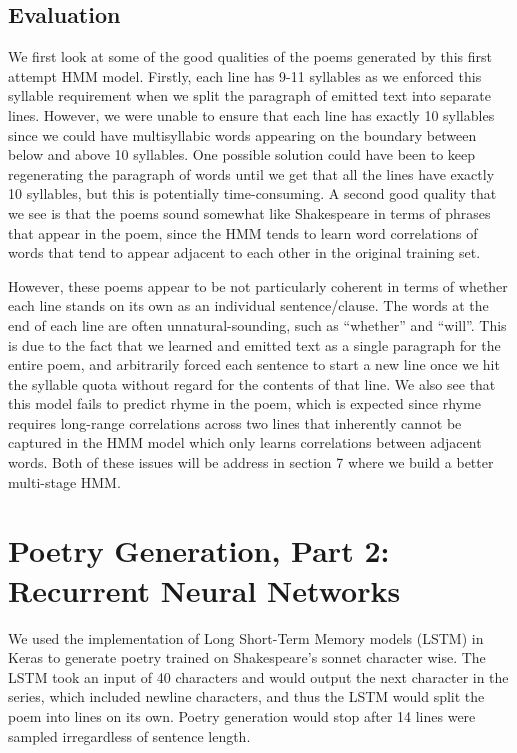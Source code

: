 \subsection*{Evaluation}
We first look at some of the good qualities of the poems generated by this first attempt HMM model. Firstly, each line has 9-11 syllables as we enforced this syllable requirement when we split the paragraph of emitted text into separate lines. However, we were unable to ensure that each line has exactly 10 syllables since we could have multisyllabic words appearing on the boundary between below and above 10 syllables. One possible solution could have been to keep regenerating the paragraph of words until we get that all the lines have exactly 10 syllables, but this is potentially time-consuming. A second good quality that we see is that the poems sound somewhat like Shakespeare in terms of phrases that appear in the poem, since the HMM tends to learn word correlations of words that tend to appear adjacent to each other in the original training set.

However, these poems appear to be not particularly coherent in terms of whether each line stands on its own as an individual sentence/clause. The words at the end of each line are often unnatural-sounding, such as ``whether'' and ``will''. This is due to the fact that we learned and emitted text as a single paragraph for the entire poem, and arbitrarily forced each sentence to start a new line once we hit the syllable quota without regard for the contents of that line. We also see that this model fails to predict rhyme in the poem, which is expected since rhyme requires long-range correlations across two lines that inherently cannot be captured in the HMM model which only learns correlations between adjacent words. Both of these issues will be address in section 7 where we build a better multi-stage HMM.

\section{Poetry Generation, Part 2: Recurrent Neural Networks}

We used the implementation of Long Short-Term Memory models (LSTM) in Keras to generate poetry trained on Shakespeare's sonnet character wise. The LSTM took an input of 40 characters and would output the next character in the series, which included newline characters, and thus the LSTM would split the poem into lines on its own. Poetry generation would stop after 14 lines were sampled irregardless of sentence length.

